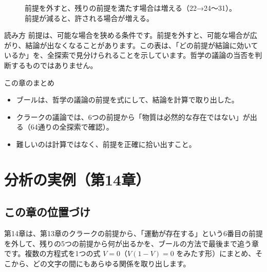 \documentclass[a4paper,11pt,openany]{ltjsbook}
\begin{document}
\begin{figure}[htbp]
\centering
{}
\caption{前提を外すと、残りの前提を満たす場合は増える（22→24〜31）。前提が減ると、許される場合が増える。}
\end{figure}

\begin{notebox}{読み方}
前提は、可能な場合を狭める条件です。前提を外すと、可能な場合が広がり、結論が出なくなることがあります。この表は、「どの前提が結論に効いているか」を、全探索で見分けられることを示しています。哲学の議論の当否を判断するものではありません。
\end{notebox}

\begin{pointbox}{この章のまとめ}
\begin{itemize}[leftmargin=*]
\item ブールは、哲学の議論の前提を式にして、結論を計算で取り出した。
\item クラークの議論では、6つの前提から「物質は必然的な存在ではない」が出る（64通りの全探索で確認）。
\item 難しいのは計算ではなく、前提を正確に拾い出すこと。
\end{itemize}
\end{pointbox}

\chapter{分析の実例（第14章）}

\section{この章の位置づけ}

第14章は、第13章のクラークの前提から、「運動が存在する」という6番目の前提を外して、残りの5つの前提から何が出るかを、ブールの方法で最後まで追う章です。複数の方程式を1つの式 $V=0$（$V(1-V)=0$ をみたす形）にまとめ、そこから、どの文字の間にもあらゆる関係を取り出します。
\end{document}
